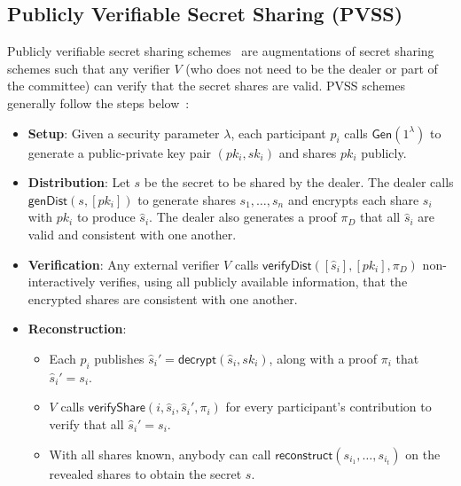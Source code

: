 \subsection{Publicly Verifiable Secret Sharing (PVSS)}
Publicly verifiable secret sharing schemes~\cite{first_pvss_chor, pvss_stadler, pvss_schoenmakers,pvss_paillier_ruiz,pvss_pairings_heidervand,pvss_scrape} are augmentations of secret sharing schemes such that any verifier $V$ (who does not need to be the dealer or part of the committee) can verify that the secret shares are valid.
PVSS schemes generally follow the steps below~\cite{pvss_scrape}:
\begin{itemize}
    \item \textbf{Setup}:
    Given a security parameter $\lambda$, each participant $p_i$ calls $\textsf{Gen}(1^{\lambda})$ to generate a public-private key pair $(pk_i, sk_i)$ and shares $pk_i$ publicly.
    \item \textbf{Distribution}:
    Let $s$ be the secret to be shared by the dealer.
    The dealer calls $\textsf{genDist}(s, [pk_i])$ to generate shares $s_1, \dots, s_n$ and encrypts each share $s_i$ with $pk_i$ to produce $\hat{s}_i$.
    The dealer also generates a proof $\pi_D$ that all $\hat{s}_i$ are valid and consistent with one another.
    \item \textbf{Verification}:
    Any external verifier $V$ calls $\textsf{verifyDist}([\hat{s}_i], [pk_i], \pi_D)$ non-interactively verifies, using all publicly available information, that the encrypted shares are consistent with one another.
    \item \textbf{Reconstruction}:
        \begin{itemize}
            \item Each $p_i$ publishes $\hat{s}_i' = \textsf{decrypt}(\hat{s}_i, sk_i)$, along with a proof $\pi_i$ that $\hat{s}_i' = s_i$.
            \item $V$ calls $\textsf{verifyShare}(i, \hat{s}_i, \hat{s}_i', \pi_i)$ for every participant's contribution to verify that all $\hat{s}_i' = s_i$.
            \item With all shares known, anybody can call $\textsf{reconstruct}(s_{i_1}, \dots, s_{i_t})$ on the revealed shares to obtain the secret $s$.
        \end{itemize} 
\end{itemize}

